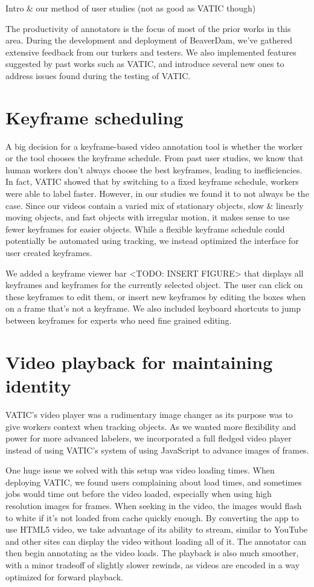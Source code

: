 
Intro \& our method of user studies (not as good as VATIC though)

The productivity of annotators is the focus of most of the prior works in this area.
During the development and deployment of BeaverDam, we've gathered extensive feedback from our turkers and testers.
We also implemented features suggested by past works such as VATIC,
and introduce several new ones to address issues found during the testing of VATIC.

\section{Keyframe scheduling}

A big decision for a keyframe-based video annotation tool is whether the worker or the tool chooses the keyframe schedule.
From past user studies, we know that human workers don't always choose the best keyframes, leading to inefficiencies.
In fact, VATIC showed that by switching to a fixed keyframe schedule, workers were able to label faster.
However, in our studies we found it to not always be the case.
Since our videos contain a varied mix of stationary objects, slow \& linearly moving objects, and fast objects with irregular motion, it makes sense to use fewer keyframes for easier objects.
While a flexible keyframe schedule could potentially be automated using tracking, we instead optimized the interface for user created keyframes.

We added a keyframe viewer bar <TODO: INSERT FIGURE> that displays all keyframes and keyframes for the currently selected object.
The user can click on these keyframes to edit them, or insert new keyframes by editing the boxes when on a frame that's not a keyframe.
We also included keyboard shortcuts to jump between keyframes for experts who need fine grained editing.

\section{Video playback for maintaining identity}

VATIC's video player was a rudimentary image changer as its purpose was to give workers context when tracking objects.
As we wanted more flexibility and power for more advanced labelers, we incorporated a full fledged video player instead of using VATIC's system of using JavaScript to advance images of frames.

One huge issue we solved with this setup was video loading times.
When deploying VATIC, we found users complaining about load times, and sometimes jobs would time out before the video loaded, especially when using high resolution images for frames.
When seeking in the video, the images would flash to white if it's not loaded from cache quickly enough.
By converting the app to use HTML5 video, we take advantage of its ability to stream, similar to YouTube and other sites can display the video without loading all of it.
The annotator can then begin annotating as the video loads.
The playback is also much smoother, with a minor tradeoff of slightly slower rewinds, as videos are encoded in a way optimized for forward playback.

